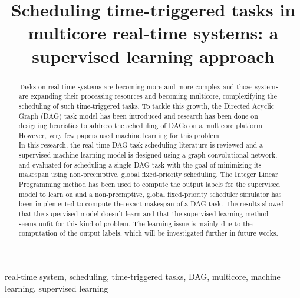 \documentclass[conference]{IEEEtran}
\begin{document}
\title{Scheduling time-triggered tasks in multicore real-time systems: a supervised learning approach\\
}

\author{
}

\maketitle
\thispagestyle{plain}

\begin{abstract}
Tasks on real-time systems are becoming more and more complex and
those systems are expanding their processing resources and becoming multicore, complexifying
the scheduling of such time-triggered tasks.
To tackle this growth, the Directed Acyclic Graph (DAG) task model has been introduced and
research has been done on designing heuristics
to address the scheduling of DAGs on a multicore platform.
However, very few papers used machine learning for this problem.\\
In this research, the real-time DAG task scheduling literature is reviewed 
and a supervised machine learning model is designed
using a graph convolutional network, and evaluated 
for scheduling a single DAG task with the goal of minimizing its makespan 
using non-preemptive, global fixed-priority scheduling.
The Integer Linear Programming method has been 
used to compute the output labels for the supervised model to learn on
and a non-preemptive, global fixed-priority scheduler simulator 
has been implemented to compute the exact makespan of a DAG task.
The results showed that the supervised model doesn't learn
and that the supervised learning method seems unfit 
for this kind of problem.
The learning issue is mainly due to the computation of 
the output labels, which will be
investigated further in future works.
\end{abstract}

\begin{IEEEkeywords}
real-time system, scheduling, time-triggered tasks, DAG, multicore, machine learning, supervised learning
\end{IEEEkeywords}
\end{document}

